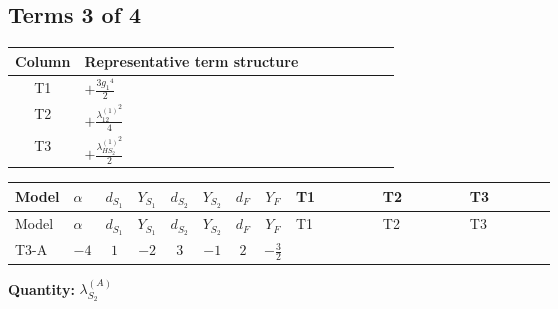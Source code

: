 \documentclass[8pt]{article}
\begin{document}
\begin{landscape}
\subsection*{Terms 3 of 4}
\begin{center}
\begin{tabular}{@{}c >{\raggedright\arraybackslash}p{0.82\linewidth}@{}}
\toprule
Column & Representative term structure \\
\midrule
T1 & \(\displaystyle +\frac{3 {g_1}^4}{2}\) \\
\midrule
T2 & \(\displaystyle +\frac{{\lambda_{12}^{(1)}}^2}{4}\) \\
\midrule
T3 & \(\displaystyle +\frac{{\lambda_{HS_2}^{(1)}}^2}{2}\) \\
\midrule
\bottomrule
\end{tabular}
\end{center}
\smallskip
\tiny
\begin{longtable}{@{}llcccccc >{\raggedright\arraybackslash}p{0.21\linewidth} >{\raggedright\arraybackslash}p{0.21\linewidth} >{\raggedright\arraybackslash}p{0.21\linewidth}@{}}
\toprule
Model & $\alpha$ & $d_{S_1}$ & $Y_{S_1}$ & $d_{S_2}$ & $Y_{S_2}$ & $d_F$ & $Y_F$ & T1 & T2 & T3 \\
\midrule
\endfirsthead
\toprule
Model & $\alpha$ & $d_{S_1}$ & $Y_{S_1}$ & $d_{S_2}$ & $Y_{S_2}$ & $d_F$ & $Y_F$ & T1 & T2 & T3 \\
\midrule
\endhead
T3-A & $-4$ & $1$ & $-2$ & $3$ & $-1$ & $2$ & $-\frac{3}{2}$ & \scriptsize\adjustbox{max width=\linewidth}{$\begin{gathered} +\frac{3 {g_1}^4}{2}\end{gathered}$} & \scriptsize\adjustbox{max width=\linewidth}{$\begin{gathered} +\frac{{\lambda_{12}^{(1)}}^2}{4}\end{gathered}$} & \scriptsize\adjustbox{max width=\linewidth}{$\begin{gathered} +\frac{{\lambda_{HS_2}^{(1)}}^2}{2}\end{gathered}$} \\
\midrule
\bottomrule
\end{longtable}
\clearpage
\noindent\textbf{Quantity: }$\lambda_{S_2}^{(A)}$\par\smallskip

\end{landscape}
\end{document}
